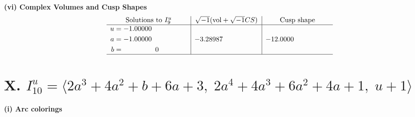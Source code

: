 \documentclass[1p]{elsarticle_modified}
\theoremstyle{definition}
\newcommand{\I}{\sqrt{-1}}
\begin{document}
\newpage\flushleft \textbf{(vi) Complex Volumes and Cusp Shapes}
$$\begin{array}{c|c|c}  
\text{Solutions to }I^u_{9}& \I (\text{vol} + \sqrt{-1}CS) & \text{Cusp shape}\\
 \hline 
\begin{aligned}
u &= -1.00000\phantom{ +0.000000I} \\
a &= -1.00000\phantom{ +0.000000I} \\
b &= \phantom{-0.000000 } 0\end{aligned}
 & -3.28987\phantom{ +0.000000I} & -12.0000\phantom{ +0.000000I}\\
 \hline 
 \end{array}$$\newpage\newpage\renewcommand{\arraystretch}{1}
\centering \section*{X. $I^u_{10}= \langle 2 a^3+4 a^2+b+6 a+3,\;2 a^4+4 a^3+6 a^2+4 a+1,\;u+1 \rangle$}
\flushleft \textbf{(i) Arc colorings}\\
\end{document}
